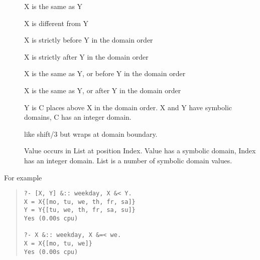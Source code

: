 \begin{description}
\item[]
    X is the same as Y
\item[]
    X is different from Y
\item[]
    X is strictly before Y in the domain order
\item[]
     X is strictly after Y in the domain order
\item[]
    X is the same as Y, or before Y in the domain order
\item[]
    X is the same as Y, or after Y in the domain order
\item[]
    Y is C places above X in the domain order.
    X and Y have symbolic domains, C has an integer domain.
\item[]
    like shift/3 but wraps at domain boundary.
\item[]
    Value occurs in List at position Index.
    Value has a symbolic domain, Index has an integer domain.
    List is a number of symbolic domain values.
\end{description}
For example
\begin{quote}\begin{verbatim}
?- [X, Y] &:: weekday, X &< Y.
X = X{[mo, tu, we, th, fr, sa]}
Y = Y{[tu, we, th, fr, sa, su]}
Yes (0.00s cpu)

?- X &:: weekday, X &=< we.
X = X{[mo, tu, we]}
Yes (0.00s cpu)
\end{verbatim}\end{quote}
    

